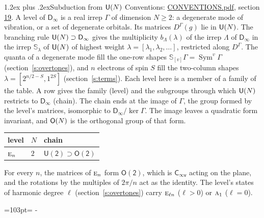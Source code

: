 \documentclass[10pt,a4paper]{article}
\makeatletter
\renewcommand\section{\@startsection{section}{1}{\z@}{-3ex plus -1ex minus -.2ex}%
  {1.2ex plus .2ex}{\normalfont\large\sffamily\bfseries\color{parttitle}}}
\newcommand{\needspace}[1]{\par\penalty-100\begingroup\dimen0=#1\relax\dimen2=\pagegoal
  \advance\dimen2-\pagetotal\ifdim\dimen0>\dimen2\relax\ifdim\dimen2>0pt\vfil\break\fi\fi
  \endgroup}
\numberwithin{equation}{section}
\newcommand{\grp}[1]{\mathsf{#1}}
\newcommand{\irr}[1]{\text{\normalfont\scshape #1}}
\newcommand{\repD}[1]{D^{#1}}
\newcommand{\schur}[1]{\mathbb{S}_{#1}}
\newcommand{\shape}[1]{[#1]}
\makeatother
\begin{document}
\section{Subduction from \texorpdfstring{$\grp{U(\mathnormal{N})}$}{U(N)}}\label{s:unitary}
Conventions: \href{../../CONVENTIONS.pdf}{CONVENTIONS.pdf}, section \href{../../CONVENTIONS.pdf\#conv.19}{19}.
\leavevmode\label{n:local.level.dimension}A level of $\grp{D_{\infty}}$ is a real irrep $\Gamma$ of dimension $N \ge 2$: a degenerate mode of vibration, or a set of degenerate orbitals. \label{n:group.unitary}Its matrices $\repD{\Gamma}(g)$ lie in $\grp{U(\mathnormal{N})}$. \label{n:irrep.schur}\label{n:shape.partition}\label{n:local.partition}\label{n:function.multiplicity.unitary}The branching rule $\grp{U(\mathnormal{N})} \supset \grp{D_{\infty}}$ gives the multiplicity $b_\Lambda(\lambda)$ of the irrep $\Lambda$ of $\grp{D_{\infty}}$ in the irrep $\schur{\lambda}$ of $\grp{U(\mathnormal{N})}$ of highest weight $\lambda = \shape{\lambda_1, \lambda_2, \dots}$, restricted along $\repD{\Gamma}$. \label{n:local.partition.power}\label{n:local.electrons}\label{n:local.spin}The quanta of a degenerate mode fill the one-row shapes $\schur{\shape{v}}\Gamma = \operatorname{Sym}^{v}\Gamma$ (section~\ref{s:overtones}), and $n$ electrons of spin $S$ fill the two-column shapes $\lambda = \shape{2^{n/2-S}, 1^{2S}}$ (section~\ref{s:terms}).
Each level here is a member of a family of the table. \label{n:head.level}\label{n:head.chain}A row gives the family (level) and the subgroups through which $\grp{U(\mathnormal{N})}$ restricts to $\grp{D_{\infty}}$ (chain). The chain ends at the image of $\Gamma$, the group formed by the level's matrices, isomorphic to $\grp{D_{\infty}}/\ker\Gamma$. The image leaves a quadratic form invariant, and $\grp{O(\mathnormal{N})}$ is the orthogonal group of that form.
{\small\begin{longtable}{@{}lll@{}}\toprule
level & $N$ & chain\\\midrule\endhead
\bottomrule\endfoot\endlastfoot
$\irr{e}_{n}$ & $2$ & $\grp{U(2)} \supset \grp{O(2)}$\\
\bottomrule\end{longtable}}
For every $n$, the matrices of $\irr{e}_n$ form $\grp{O(2)}$, which is \href{Cinfv.pdf}{$\grp{C_{\infty v}}$} acting on the plane, and the rotations by the multiples of $2\pi/n$ act as the identity. \label{n:index.harmonic.degree}The level's states of harmonic degree $\ell$ (section~\ref{s:overtones}) carry $\irr{e}_{\ell n}$ ($\ell > 0$) or $\irr{a}_{1}$ ($\ell = 0$).
\needspace{103pt}
\end{document}
